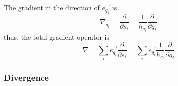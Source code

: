 The gradient in the direction of $\vec{e_{q_1}}$ is
\begin{equation} \label{eq:dirgradcurvi} \nabla_{q_i} =
  \frac{\partial}{\partial s_i} = \frac{1}{h_{q_i}}
  \frac{\partial}{\partial q_i}
\end{equation}
thus, the total gradient operator is
\begin{equation}
  \label{eq:gradincurvi}
  \nabla = \sum_i \vec{e_{q_i}} \frac{\partial}{\partial s_i} = \sum_i \vec{e_{q_i}} \frac{1}{h_{q_i}} \frac{\partial}{\partial q_i}
\end{equation}

\subsubsection{Divergence}
\label{sec:divcurvi}

